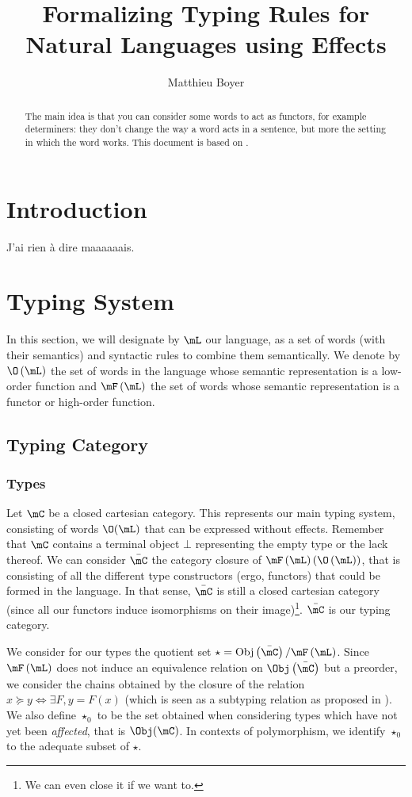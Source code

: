 \documentclass[math, english, info]{cours}
\title{Formalizing Typing Rules for Natural Languages using Effects}
\author{Matthieu Boyer}
\begin{document}
\bettertitle

\begin{abstract}
The main idea is that you can consider some words to act as functors, for example determiners: they don't change the way a word acts in a sentence,
but more the setting in which the word works.
This document is based on \cite{bumfordEffectdrivenInterpretation}.
\end{abstract}

\section*{Introduction}
J'ai rien à dire maaaaaais.

\section{Typing System}
In this section, we will designate by $\mL$ our language, as a set of words (with their semantics) and syntactic rules to combine them semantically.
We denote by $\O\left( \mL \right)$ the set of words in the language whose semantic representation is a low-order function and $\mF\left( \mL \right)$ the set of words whose semantic representation is a functor or high-order function.

\subsection{Typing Category}
\subsubsection{Types}
Let $\mC$ be a closed cartesian category. This represents our main typing system, consisting of words $\O(\mL)$ that can be expressed without effects.
Remember that $\mC$ contains a terminal object $\bot$ representing the empty type or the lack thereof.
We can consider $\bar{\mC}$ the category closure of $\mF\left( \mL \right)\left(\O\left( \mL \right)\right)$, that is consisting of all the different type constructors (ergo, functors) that could be formed in the language.
In that sense, $\bar{\mC}$ is still a closed cartesian category (since all our functors induce isomorphisms on their image)\footnote{We can even close it if we want to.}.
$\bar{\mC}$ is our typing category.

We consider for our types the quotient set $\star = \mathrm{Obj}\left( \bar{\mC} \right)/\mF\left( \mL \right)$.
Since $\mF\left( \mL \right)$ does not induce an equivalence relation on $\Obj\left( \bar{\mC} \right)$ but a preorder, we consider the chains obtained by the closure of the relation $x\succeq y \Leftrightarrow \exists F, y = F(x)$ (which is seen as a subtyping relation as proposed in \cite{melliesFunctorsAreType2015}).
We also define $\star_{0}$ to be the set obtained when considering types which have not yet been \emph{affected}, that is $\Obj(\mC)$.
In contexts of polymorphism, we identify $\star_{0}$ to the adequate subset of $\star$.
\end{document}
